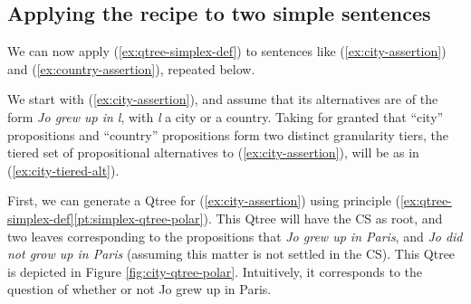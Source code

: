 \subsection{Applying the recipe to two simple sentences}

We can now apply (\ref{ex:qtree-simplex-def}) to sentences like (\ref{ex:city-assertion}) and (\ref{ex:country-assertion}), repeated below.

\begin{exe}
	\begin{xlist}
	\end{xlist}
\end{exe}

We start with (\ref{ex:city-assertion}), and assume that its alternatives are of the form \textit{Jo grew up in l}, with \textit{l} a city or a country. Taking for granted that ``city'' propositions and ``country'' propositions form two distinct granularity tiers, the tiered set of propositional alternatives to (\ref{ex:city-assertion}), will be as in (\ref{ex:city-tiered-alt}).

\begin{exe}
	\label{ex:city-tiered-alt}
\end{exe} 



First, we can generate a Qtree for (\ref{ex:city-assertion})  using principle (\ref{ex:qtree-simplex-def}\ref{pt:simplex-qtree-polar}). This Qtree will have the CS as root, and two leaves corresponding to the propositions that \textit{Jo grew up in Paris}, and \textit{Jo did not grow up in Paris} (assuming this matter is not settled in the CS). This Qtree is depicted in Figure \ref{fig:city-qtree-polar}. Intuitively, it corresponds to the question of whether or not Jo grew up in Paris.

